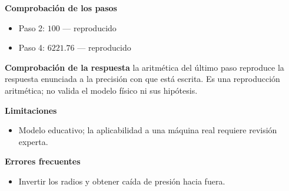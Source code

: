 \documentclass[10pt,openany]{book}
\begin{document}
\begin{tcolorbox}[title={Problema resuelto 1}, studiumworked, breakable]
\noindent\textbf{Comprobación de los pasos}
\begin{itemize}
\item Paso 2: $100$ — reproducido
\item Paso 4: $6221.76$ — reproducido
\end{itemize}

\noindent\textbf{Comprobación de la respuesta} la aritmética del último paso reproduce la respuesta enunciada a la precisión con que está escrita. Es una reproducción aritmética; no valida el modelo físico ni sus hipótesis.

\noindent\textbf{Limitaciones}
\begin{itemize}
\item Modelo educativo; la aplicabilidad a una máquina real requiere revisión experta.
\end{itemize}

\noindent\textbf{Errores frecuentes}
\begin{itemize}
\item Invertir los radios y obtener caída de presión hacia fuera.
\end{itemize}
\end{tcolorbox}
\end{document}
